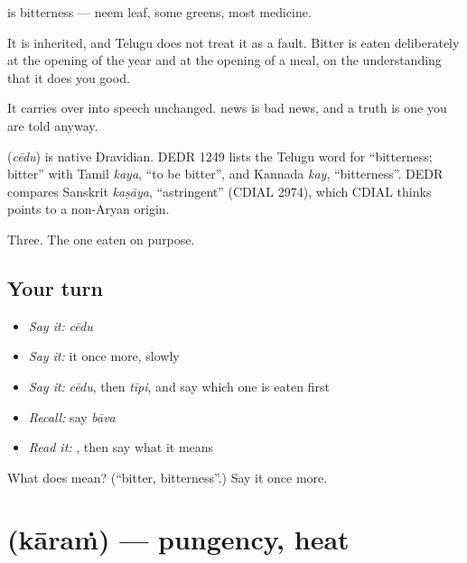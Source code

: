  is bitterness — neem leaf, some greens, most medicine.

It is inherited, and Telugu does not treat it as a fault. Bitter is eaten deliberately at the opening of the year and at the opening of a meal, on the understanding that it does you good.

It carries over into speech unchanged.  news is bad news, and a  truth is one you are told anyway.

\begin{cousinweb}
\textbf{} (\emph{cēdu}) is native Dravidian. DEDR 1249 lists the Telugu word for \textquotedblleft{}bitterness; bitter\textquotedblright{} with Tamil \emph{kaya}, \textquotedblleft{}to be bitter\textquotedblright{}, and Kannada \emph{kay}, \textquotedblleft{}bitterness\textquotedblright{}. DEDR compares Sanskrit \emph{kaṣāya}, \textquotedblleft{}astringent\textquotedblright{} (CDIAL 2974), which CDIAL thinks points to a non-Aryan origin.
\end{cousinweb}

\begin{grammarlens}[title={What you've built}]
Three. The one eaten on purpose.
\end{grammarlens}

\subsection*{Your turn}
\begin{itemize}
\raggedright
  \item \emph{Say it:} \emph{cēdu}
  \item \emph{Say it:} it once more, slowly
  \item \emph{Say it:} \emph{cēdu}, then \emph{tīpi}, and say which one is eaten first
  \item \emph{Recall:} say \emph{bāva}
  \item \emph{Read it:} \textbf{}, then say what it means
\end{itemize}

\begin{tcolorbox}[breakable,colback=teal!4,colframe=teal!35!black,title={Before you move on}]
What does  mean? (\textquotedblleft{}bitter, bitterness\textquotedblright{}.) Say it once more.
\end{tcolorbox}
\section[\texorpdfstring{\te{కారం} (kāraṁ)}{కారం (kāraṁ)}]{ (kāraṁ) — pungency, heat}

